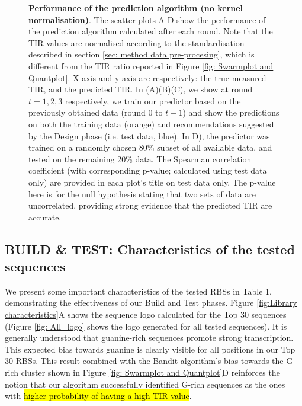 \documentclass{scrartcl}[2013/05/29]%
\begin{document}
\begin{figure}[!ht]
\begin{subfigure}[b]{0.49\textwidth}
    \end{subfigure}
    \caption{\textbf{Performance of the prediction algorithm (no kernel normalisation)}. The scatter plots A-D show the performance of the prediction algorithm calculated after each round.
    Note that the TIR values are normalised according to the standardisation described in section \ref{sec: method data pre-procesing}, which is different from the TIR ratio reported in Figure \ref{fig: Swarmplot and Quantplot}.
    X-axis and y-axis are respectively: the true measured TIR, and the predicted TIR.
    In (A)(B)(C), we show at round $t = 1,2,3$ respectively, we train our predictor based on the previously obtained data (round 0 to $t-1$) and show the predictions on both the training data (orange) and recommendations suggested by the Design phase (i.e. test data, blue).
    In D), the predictor was trained on a randomly chosen 80\% subset of all available data, and tested on the remaining 20\% data.
    The Spearman correlation coefficient (with corresponding p-value; calculated using test data only) are provided in each plot's title on test data only.
    The p-value here is for the null hypothesis stating that two sets of data are uncorrelated, providing strong evidence that the predicted TIR are accurate.
    }
    \label{fig: Scatterplot}
\end{figure}

\subsection{BUILD \& TEST: Characteristics of the tested sequences}
\label{sec:characteristics-of-library}


We present some important characteristics of the tested RBSs in Table 1, demonstrating the effectiveness of our Build and Test phases.
Figure \ref{fig:Library characteristics}A shows the sequence logo calculated for the Top 30 sequences (Figure \ref{fig: All_logo} shows the logo generated for all tested sequences).
It is generally understood that guanine-rich sequences promote strong transcription.
This expected bias towards guanine is clearly visible for all positions in our Top 30 RBSs.
This result combined with the Bandit algorithm's bias towards the G-rich cluster shown in Figure \ref{fig: Swarmplot and Quantplot}D reinforces the notion that our algorithm successfully identified G-rich sequences as the ones with \hl{higher probability of having a high TIR value}.\\
\end{document}
